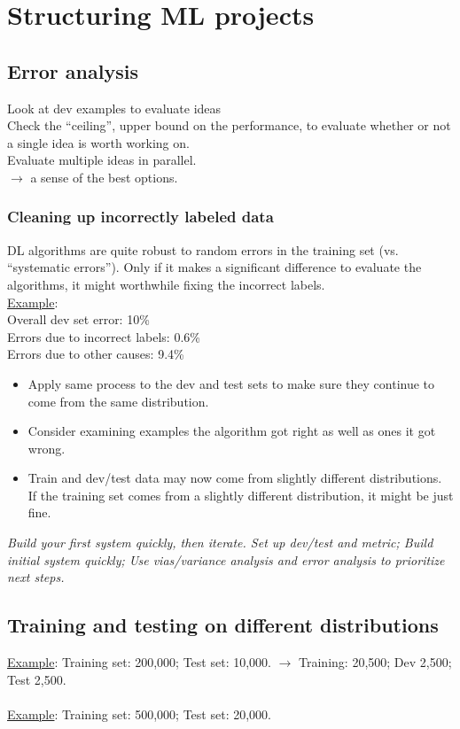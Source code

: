 \section{Structuring ML projects}
%
\subsection{Error analysis}
Look at dev examples to evaluate ideas\\
Check the ``ceiling'', upper bound on the performance, to evaluate whether or not a single idea is worth working on.\\
Evaluate multiple ideas in parallel.\\
$\rightarrow$ a sense of the best options.

\subsubsection{Cleaning up incorrectly labeled data}
DL algorithms are quite robust to random errors in the training set (vs. ``systematic errors''). Only if it makes a significant difference to evaluate the algorithms, it might worthwhile fixing the incorrect labels.\\
\underline{Example}:\\
Overall dev set error: 10\%\\
Errors due to incorrect labels: 0.6\%\\
Errors due to other causes: 9.4\%
\begin{itemize}
\item[]
Apply same process to the dev and test sets to make sure they continue to come from the same distribution.
\item[]
Consider examining examples the algorithm got right as well as ones it got wrong.
\item[]
Train and dev/test data may now come from slightly different distributions. If the training set comes from a slightly different distribution, it might be just fine.
\end{itemize}
\emph{\textcolor{Bittersweet}{Build your first system quickly, then iterate. Set up dev/test and metric; Build initial system quickly; Use vias/variance analysis and error analysis to prioritize next steps.}}

%
\subsection{Training and testing on different distributions}
\underline{Example}: Training set: 200,000; Test set: 10,000. $\rightarrow$ Training: 20,500; Dev 2,500; Test 2,500.\\
\\
\underline{Example}: Training set: 500,000; Test set: 20,000.

